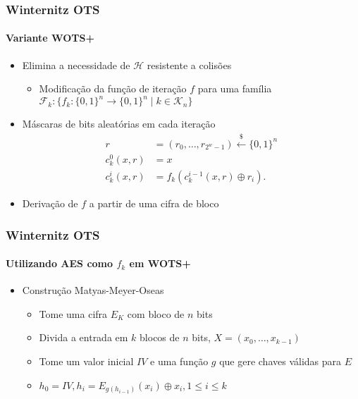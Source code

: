 \documentclass[12pt]{beamer}
\newcommand{\hh}{\mathcal{H}}
\newcommand{\binwds}[1]{\{0, 1\}^{#1}}
\begin{document}
\begin{frame}
  \frametitle{Winternitz OTS}
  \framesubtitle{Variante WOTS+}
  \begin{itemize}
    \item Elimina a necessidade de $\hh{}$ resistente a colisões
    \begin{itemize}
      \item Modificação da função de iteração $f$ para uma família
      $\mathcal{F}_k : \{f_k : \binwds{n} \longrightarrow \binwds{n} \mid k \in \mathcal{K}_n\}$
    \end{itemize}
    \item Máscaras de bits aleatórias em cada iteração
    \begin{align*}
      r &= (r_0, \dots, r_{2^w - 1}) \stackrel{\$}{\longleftarrow} \binwds{n} \\
      c^{0}_{k}(x, r) &= x \\
      c^{i}_{k}(x, r) &= f_k(c^{i-1}_{k}(x, r) \oplus r_i).
    \end{align*}
    \item Derivação de $f$ a partir de uma cifra de bloco
  \end{itemize}
\end{frame}

\begin{frame}
  \frametitle{Winternitz OTS}
  \framesubtitle{Utilizando AES como $f_k$ em WOTS+}
  \begin{itemize}
      \item Construção Matyas-Meyer-Oseas \cite[Sec. 9.41]{Menezes:1996:HAC:548089}
      \begin{itemize}
        \item Tome uma cifra $E_K$ com bloco de $n$ bits
        \item Divida a entrada em $k$ blocos de $n$ bits, $X = (x_0, \dots, x_{k - 1})$
        \item Tome um valor inicial $IV$ e uma função $g$ que gere chaves válidas para $E$
        \item $h_0 = IV, h_i = E_{g(h_{i-1})}(x_i) \oplus x_i, 1 \leq i \leq k$
      \end{itemize}
  \end{itemize}
  \begin{figure}[ht]
  \centering
\end{figure}
\end{frame}
\end{document}
